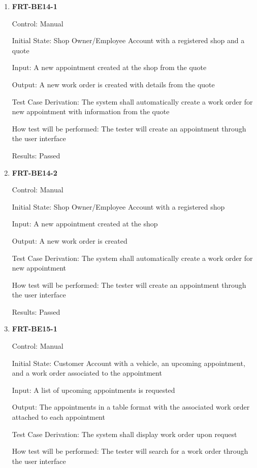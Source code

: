 \documentclass[12pt, titlepage]{article}
\begin{document}
\begin{enumerate}

	\item \textbf{FRT-BE14-1}

	      Control: Manual

	      Initial State: Shop Owner/Employee Account with a registered shop and a quote

	      Input: A new appointment created at the shop from the quote

	      Output: A new work order is created with details from the quote

	      Test Case Derivation: The system shall automatically create a work order for new appointment with
	      information from the quote

	      How test will be performed: The tester will create an appointment through the user interface

	      Results: Passed

	\item \textbf{FRT-BE14-2}

	      Control: Manual

	      Initial State: Shop Owner/Employee Account with a registered shop

	      Input: A new appointment created at the shop

	      Output: A new work order is created

	      Test Case Derivation: The system shall automatically create a work order for new appointment

	      How test will be performed: The tester will create an appointment through the user interface

	      Results: Passed

	\item \textbf{FRT-BE15-1}

	      Control: Manual

	      Initial State: Customer Account with a vehicle, an upcoming appointment, and a work order
	      associated to the appointment

	      Input: A list of upcoming appointments is requested

	      Output: The appointments in a table format with the associated work order attached to each
	      appointment

	      Test Case Derivation: The system shall display work order upon request

	      How test will be performed: The tester will search for a work order through the user interface


\end{enumerate}
\end{document}
